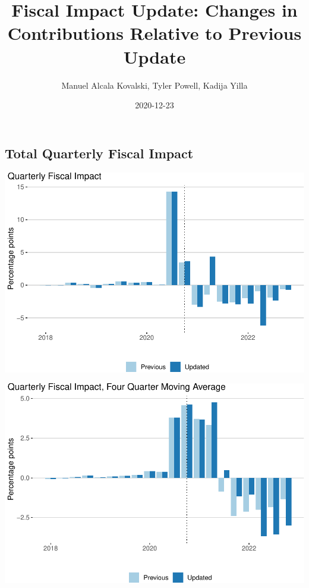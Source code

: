 \documentclass[
]{article}
\title{Fiscal Impact Update: Changes in Contributions Relative to
Previous Update}
\author{Manuel Alcala Kovalski, Tyler Powell, Kadija Yilla}
\date{2020-12-23}
\begin{document}
\maketitle

\hypertarget{total-quarterly-fiscal-impact}{%
\subsection{Total Quarterly Fiscal
Impact}\label{total-quarterly-fiscal-impact}}

\begin{center}\includegraphics{compare-update_files/figure-latex/fim-1} \end{center}

\begin{center}\includegraphics{compare-update_files/figure-latex/fim-ma-1} \end{center}
\end{document}
